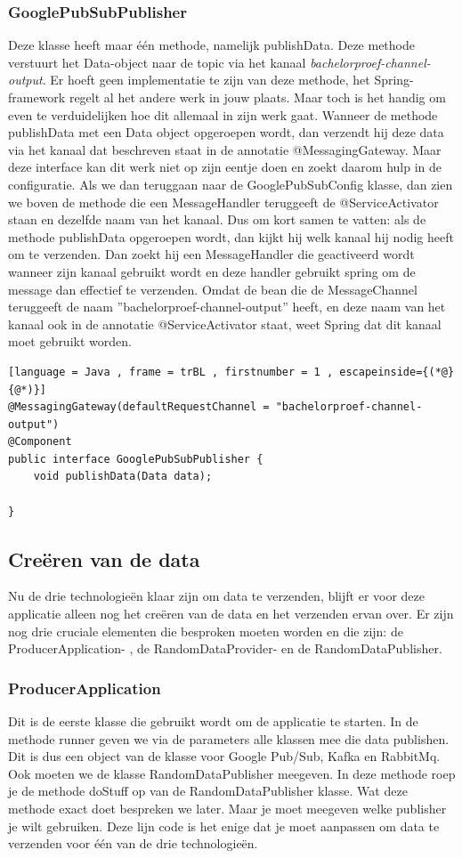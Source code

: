 \subsubsection{GooglePubSubPublisher}
Deze klasse heeft maar één methode, namelijk publishData. Deze methode verstuurt het Data-object naar de topic via het kanaal \emph{bachelorproef-channel-output}. Er hoeft geen implementatie te zijn van deze methode, het Spring-framework regelt al het andere werk in jouw plaats. Maar toch is het handig om even te verduidelijken hoe dit allemaal in zijn werk gaat. Wanneer de methode publishData met een Data object opgeroepen wordt, dan verzendt hij deze data via het kanaal dat beschreven staat in de annotatie @MessagingGateway. Maar deze interface kan dit werk niet op zijn eentje doen en zoekt daarom hulp in de configuratie. Als we dan teruggaan naar de GooglePubSubConfig klasse, dan zien we boven de methode die een MessageHandler teruggeeft de @ServiceActivator staan en dezelfde naam van het kanaal. Dus om kort samen te vatten: als de methode publishData opgeroepen wordt, dan kijkt hij welk kanaal hij nodig heeft om te verzenden. Dan zoekt hij een MessageHandler die geactiveerd wordt wanneer zijn kanaal gebruikt wordt en deze handler gebruikt spring om de message dan effectief te verzenden. Omdat de bean die de MessageChannel teruggeeft de naam ''bachelorproef-channel-output'' heeft, en deze naam van het kanaal ook in de annotatie @ServiceActivator staat, weet Spring dat dit kanaal moet gebruikt worden.

 \begin{lstlisting}[language = Java , frame = trBL , firstnumber = 1 , escapeinside={(*@}{@*)}]
@MessagingGateway(defaultRequestChannel = "bachelorproef-channel-output")
@Component
public interface GooglePubSubPublisher {
    void publishData(Data data);
    
}
     \end{lstlisting}
     
\subsection{Creëren van de data}
Nu de drie technologieën klaar zijn om data te verzenden, blijft er voor deze applicatie alleen nog het creëren van de data en het verzenden ervan over. Er zijn nog drie cruciale elementen die besproken moeten worden en die zijn: de ProducerApplication- , de RandomDataProvider- en de RandomDataPublisher.

\subsubsection{ProducerApplication}
Dit is de eerste klasse die gebruikt wordt om de applicatie te starten. In de methode runner geven we via de parameters alle klassen mee die data publishen. Dit is dus een object van de klasse voor Google Pub/Sub, Kafka en RabbitMq. Ook moeten we de klasse RandomDataPublisher meegeven. In deze methode roep je de methode doStuff op van de RandomDataPublisher klasse. Wat deze methode exact doet bespreken we later. Maar je moet meegeven welke publisher je wilt gebruiken. Deze lijn code is het enige dat je moet aanpassen om data te verzenden voor één van de drie technologieën.

